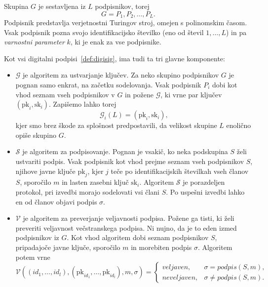 \documentclass[isrm2, tisk]{fmfdelo}
\begin{document}
\begin{definicija} 
    Skupina $G$ je sestavljena iz $L$ podpisnikov, torej
    $$ 
    G = P_1, P_2, \dots, P_L.
    $$
    Podpisnik predstavlja verjetnostni Turingov stroj, omejen s polinomskim časom. Vsak podpisnik pozna 
    svojo identifikacijsko številko (eno od števil $1, \dots, L$) in pa \textit{varnostni parameter} $k$, 
    ki je enak za vse podpisnike.

    Kot vsi digitalni podpisi~\ref{def:digisig}, ima tudi ta tri glavne komponente: 
    \begin{itemize}
        \item $\mathcal{G}$ je algoritem za ustvarjanje ključev. Za neko skupino podpisnikov $G$ je pognan samo 
            enkrat, na začetku sodelovanja. Vsak podpisnik $P_i$ dobi kot vhod seznam vseh podpisnikov v $G$ 
            in požene $\mathcal{G}$, ki vrne par ključev $(\text{pk}_i, \text{sk}_i)$. Zapišemo lahko torej 
            $$ 
            \mathcal{G}_i(L) = (\text{pk}_i, \text{sk}_i),
            $$
            kjer smo brez škode za splošnost predpostavili, da velikost skupine $L$ enolično opiše 
            skupino $G$.
        \item $\mathcal{S}$ je algoritem za podpisovanje. Pognan je vsakič, ko neka podskupina $S$ želi 
            ustvariti podpis. Vsak podpisnik kot vhod prejme seznam vseh podpisnikov $S$, njihove 
            javne ključe $\text{pk}_j$, kjer $j$ teče po identifikacijskih številkah vseh članov $S$, 
            sporočilo $m$ in lasten zasebni ključ $\text{sk}_i$. Algoritem $\mathcal{S}$ je porazdeljen 
            protokol, pri izvedbi morajo sodelovati vsi člani $S$. Po uspešni izvedbi lahko en od članov 
            objavi podpis $\sigma$.
        \item $\mathcal{V}$ je algoritem za preverjanje veljavnosti podpisa. Požene ga tisti, ki želi 
            preveriti veljavnost večstranskega podpisa. Ni nujno, da je to eden izmed podpisnikov iz $G$. 
            Kot vhod algoritem dobi seznam podpisnikov $S$, pripadajoče javne ključe, sporočilo $m$ in 
            morebiten podpis $\sigma$. Algoritem potem vrne
            $$ 
            \mathcal{V}((id_1, \dots, id_l), (\text{pk}_{id_1}, \dots, \text{pk}_{id_l}), m, \sigma) = 
            \begin{cases}
                veljaven, & \sigma = podpis(S, m), \\
                neveljaven, & \sigma \neq podpis(S, m).
            \end{cases}
            $$
    \end{itemize}
\end{definicija}
\end{document}
